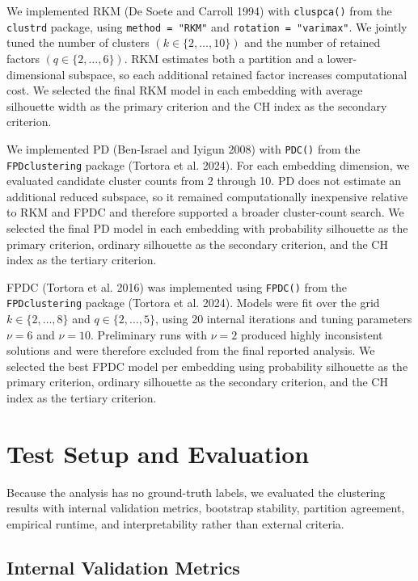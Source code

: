 \documentclass[
  11pt,
  letterpaper,
  DIV=11,
  numbers=noendperiod]{scrartcl}
\begin{document}
We implemented RKM (De Soete and Carroll 1994) with \texttt{cluspca()}
from the \texttt{clustrd} package, using \texttt{method\ =\ "RKM"} and
\texttt{rotation\ =\ "varimax"}. We jointly tuned the number of clusters
\((k \in \{2, \ldots, 10\})\) and the number of retained factors
\((q \in \{2, \ldots, 6\})\). RKM estimates both a partition and a
lower-dimensional subspace, so each additional retained factor increases
computational cost. We selected the final RKM model in each embedding
with average silhouette width as the primary criterion and the CH index
as the secondary criterion.

We implemented PD (Ben-Israel and Iyigun 2008) with \texttt{PDC()} from
the \texttt{FPDclustering} package (Tortora et al. 2024). For each
embedding dimension, we evaluated candidate cluster counts from 2
through 10. PD does not estimate an additional reduced subspace, so it
remained computationally inexpensive relative to RKM and FPDC and
therefore supported a broader cluster-count search. We selected the
final PD model in each embedding with probability silhouette as the
primary criterion, ordinary silhouette as the secondary criterion, and
the CH index as the tertiary criterion.

FPDC (Tortora et al. 2016) was implemented using \texttt{FPDC()} from
the \texttt{FPDclustering} package (Tortora et al. 2024). Models were
fit over the grid \(k \in \{2, \ldots, 8\}\) and
\(q \in \{2, \ldots, 5\}\), using 20 internal iterations and tuning
parameters \(\nu = 6\) and \(\nu = 10\). Preliminary runs with
\(\nu = 2\) produced highly inconsistent solutions and were therefore
excluded from the final reported analysis. We selected the best FPDC
model per embedding using probability silhouette as the primary
criterion, ordinary silhouette as the secondary criterion, and the CH
index as the tertiary criterion.

\section{Test Setup and Evaluation}\label{sec-evaluation-framework}

Because the analysis has no ground-truth labels, we evaluated the
clustering results with internal validation metrics, bootstrap
stability, partition agreement, empirical runtime, and interpretability
rather than external criteria.

\subsection{Internal Validation
Metrics}\label{internal-validation-metrics}
\end{document}
